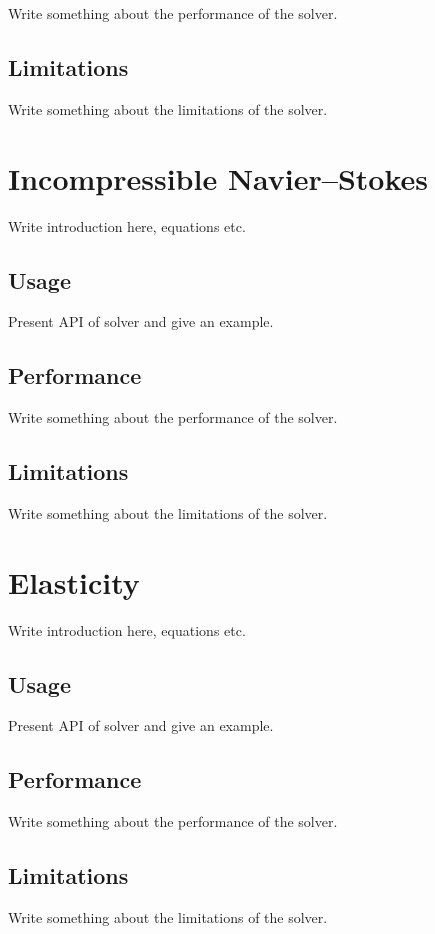 Write something about the performance of the solver.

\subsection{Limitations}

Write something about the limitations of the solver.

\section{Incompressible Navier--Stokes}

Write introduction here, equations etc.

\subsection{Usage}

Present API of solver and give an example.

\subsection{Performance}

Write something about the performance of the solver.

\subsection{Limitations}

Write something about the limitations of the solver.

\section{Elasticity}

Write introduction here, equations etc.

\subsection{Usage}

Present API of solver and give an example.

\subsection{Performance}

Write something about the performance of the solver.

\subsection{Limitations}

Write something about the limitations of the solver.
